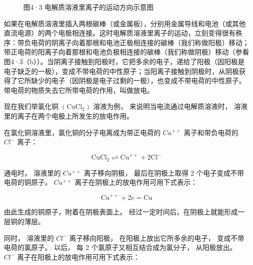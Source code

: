 \begin{figure}
\centering
\caption{图4·3 电解质溶液里离子的运动方向示意图}
\end{figure}

如果在电解质溶液里插入两根碳棒（或金属板），分别用金属导线和电池（或其他直流电源）的两个电极相连接。这时电解质溶液里离子的运动，立刻变得很有秩序：带负电荷的阴离子向着那根和电池正极相连接的碳棒（我们称做阳极）移动；带正电荷的阳离子向着那根和电池负极相连接的碳棒（我们称做阴极）移动（参看图4·3（b））。当阴离子接触到阳极时，它把多余的电子，递给了阳极（因阳极是电子缺乏的一极），变成不带电荷的中性原子；当阳离子接触到阴极时，从阴极获得了它所缺少的电子（因阴极是电子过剩的一极），也变成不带电荷的中性原子。带电荷的物质失去它所带电荷的作用，叫做放电。

现在我们举氯化铜 \(\left(\mathrm{CuCl}_{2}\right)\) 溶液为例，
来说明当电流通过电解质溶液时，
溶液里的离子在两个电极上所发生的放电作用。

在氯化铜溶液里，氯化铜的分子电离成为带正电荷的 \(Cu^{++}\)
离子和带负电荷的 \(Cl^{-}\) 离子：

\[
\mathrm{CuCl} _ {2} \rightleftharpoons \mathrm{Cu} ^ {+ +} + 2 \mathrm{Cl} ^ {-} \tag {1}
\]

通电时， 溶液里的 \(Cu^{++}\) 离子移向阴极， 最后在阴极上取得 2
个电子变成不带电荷的铜原子。 \(Cu^{++}\)
离子在阴极上的放电作用可用下式表示：

\[
\mathrm{Cu} ^ {+ +} + 2 e = \mathrm{Cu} \tag {2}
\]

由此生成的铜原子，附着在阴极表面上。
经过一定时间后，在阴极上就能形成一层铜的薄层。

同时， 溶液里的 \(Cl^{-}\) 离子移向阳极， 在阳极上放出它所多余的电子，
变成不带电荷的氯原子。 以后， 每 2 个氯原子又相互结合成为氯分子，
从阳极放出。 \(Cl^{-}\) 离子在阳极上的放电作用可用下式表示：

